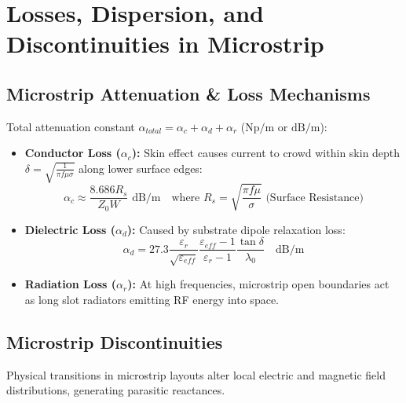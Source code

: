 \documentclass[12pt,a4paper]{article}
\begin{document}
\section{Losses, Dispersion, and Discontinuities in Microstrip}

\subsection{Microstrip Attenuation \& Loss Mechanisms}
Total attenuation constant $\alpha_{total} = \alpha_c + \alpha_d + \alpha_r$ ($\text{Np/m}$ or $\text{dB/m}$):

\begin{itemize}[leftmargin=*, itemsep=4pt]
  \item \textbf{Conductor Loss ($\alpha_c$):} Skin effect causes current to crowd within skin depth $\delta = \sqrt{\frac{1}{\pi f \mu \sigma}}$ along lower surface edges:
    \begin{equation}
      \alpha_c \approx \frac{8.686 R_s}{Z_0 W} \text{ dB/m} \quad \text{where } R_s = \sqrt{\frac{\pi f \mu}{\sigma}} \text{ (Surface Resistance)}
    \end{equation}
  \item \textbf{Dielectric Loss ($\alpha_d$):} Caused by substrate dipole relaxation loss:
    \begin{equation}
      \alpha_d = 27.3 \frac{\varepsilon_r}{\sqrt{\varepsilon_{eff}}} \frac{\varepsilon_{eff}-1}{\varepsilon_r-1} \frac{\tan\delta}{\lambda_0} \quad \text{dB/m}
    \end{equation}
  \item \textbf{Radiation Loss ($\alpha_r$):} At high frequencies, microstrip open boundaries act as long slot radiators emitting RF energy into space.
\end{itemize}

\subsection{Microstrip Discontinuities}
Physical transitions in microstrip layouts alter local electric and magnetic field distributions, generating parasitic reactances.
\end{document}
